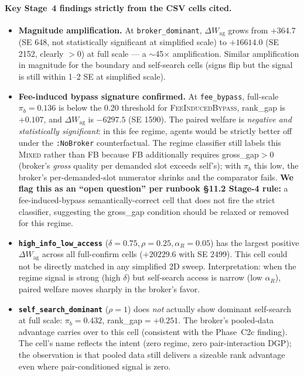 \documentclass[11pt,a4paper]{article}
\begin{document}
\paragraph{Key Stage~4 findings strictly from the CSV cells cited.}
\begin{itemize}[leftmargin=1.5em]
\item \textbf{Magnitude amplification.} At \texttt{broker\_dominant}, $\Delta W_{\text{ag}}$ grows from $+364.7$ (SE 648, not statistically significant at simplified scale) to $+16614.0$ (SE 2152, clearly $>0$) at full scale --- a $\sim$45$\times$ amplification. Similar amplification in magnitude for the boundary and self-search cells (signs flip but the signal is still within 1--2 SE at simplified scale).
\item \textbf{Fee-induced bypass signature confirmed.} At \texttt{fee\_bypass}, full-scale $\pi_b{=}0.136$ is below the 0.20 threshold for \textsc{FeeInducedBypass}, rank\_gap is $+0.107$, and $\Delta W_{\text{ag}}$ is $-6297.5$ (SE 1590). The paired welfare is \emph{negative and statistically significant}: in this fee regime, agents would be strictly better off under the \texttt{:NoBroker} counterfactual. The regime classifier still labels this \textsc{Mixed} rather than \textsc{FB} because \textsc{FB} additionally requires gross\_gap$>0$ (broker's \emph{gross} quality per demanded slot exceeds self's); with $\pi_b$ this low, the broker's per-demanded-slot numerator shrinks and the comparator fails. \textbf{We flag this as an ``open question'' per runbook §11.2 Stage-4 rule:} a fee-induced-bypass semantically-correct cell that does not fire the strict classifier, suggesting the gross\_gap condition should be relaxed or removed for this regime.
\item \textbf{\texttt{high\_info\_low\_access}} ($\delta{=}0.75,\rho{=}0.25,\alpha_R{=}0.05$) has the largest positive $\Delta W_{\text{ag}}$ across all full-confirm cells ($+20229.6$ with SE 2499). This cell could not be directly matched in any simplified 2D sweep. Interpretation: when the regime signal is strong (high $\delta$) but self-search access is narrow (low $\alpha_R$), paired welfare moves sharply in the broker's favor.
\item \textbf{\texttt{self\_search\_dominant}} ($\rho{=}1$) does \emph{not} actually show dominant self-search at full scale: $\pi_b{=}0.432$, rank\_gap${=}+0.251$. The broker's pooled-data advantage carries over to this cell (consistent with the Phase~C2c finding). The cell's name reflects the intent (zero regime, zero pair-interaction DGP); the observation is that pooled data still delivers a sizeable rank advantage even where pair-conditioned signal is zero.
\end{itemize}
\end{document}
